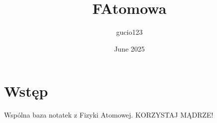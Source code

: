 \documentclass{article}
\title{FAtomowa}
\author{gucio123 }
\date{June 2025}
\begin{document}
\maketitle

\section{Wstęp}

Wspólna baza notatek z Fizyki Atomowej.
KORZYSTAJ MĄDRZE!

\end{document}
